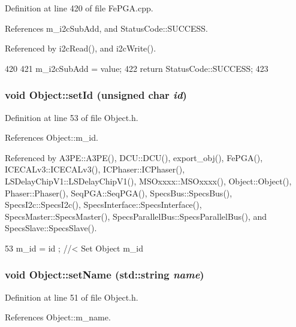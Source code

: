 Definition at line 420 of file FePGA.cpp.

References m\_\-i2cSubAdd, and StatusCode::SUCCESS.

Referenced by i2cRead(), and i2cWrite().


\begin{DoxyCode}
420                                                        {
421   m_i2cSubAdd = value;
422   return StatusCode::SUCCESS;
423 }
\end{DoxyCode}
\hypertarget{classObject_a398fe08cba594a0ce6891d59fe4f159f}{
\subsubsection[{setId}]{\setlength{\rightskip}{0pt plus 5cm}void Object::setId (unsigned char {\em id})}}
\label{classObject_a398fe08cba594a0ce6891d59fe4f159f}


Definition at line 53 of file Object.h.

References Object::m\_\-id.

Referenced by A3PE::A3PE(), DCU::DCU(), export\_\-obj(), FePGA(), ICECALv3::ICECALv3(), ICPhaser::ICPhaser(), LSDelayChipV1::LSDelayChipV1(), MSOxxxx::MSOxxxx(), Object::Object(), Phaser::Phaser(), SeqPGA::SeqPGA(), SpecsBus::SpecsBus(), SpecsI2c::SpecsI2c(), SpecsInterface::SpecsInterface(), SpecsMaster::SpecsMaster(), SpecsParallelBus::SpecsParallelBus(), and SpecsSlave::SpecsSlave().


\begin{DoxyCode}
53 { m_id    = id    ; } //< Set Object m_id
\end{DoxyCode}
\hypertarget{classObject_ae30fea75683c2d149b6b6d17c09ecd0c}{
\subsubsection[{setName}]{\setlength{\rightskip}{0pt plus 5cm}void Object::setName (std::string {\em name})}}
\label{classObject_ae30fea75683c2d149b6b6d17c09ecd0c}


Definition at line 51 of file Object.h.

References Object::m\_\-name.

